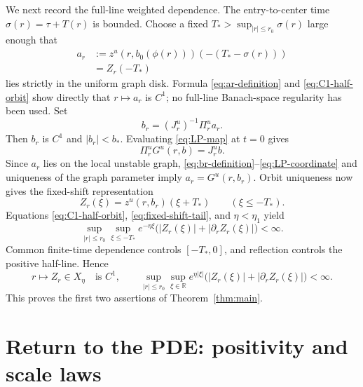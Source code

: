\documentclass[11pt,reqno]{amsart}
\numberwithin{equation}{section}
\theoremstyle{remark}
\newcommand{\R}{\mathbb R}
\begin{document}
We next record the full-line weighted dependence.  The entry-to-center time
$\sigma(r)=\tau+T(r)$ is bounded.  Choose a fixed
$T_*>\sup_{|r|\le r_0}\sigma(r)$ large enough that
\begin{equation}\label{eq:ar-definition}
 \begin{aligned}
 a_r&:=z^u\!\left(r,b_0(\phi(r))\right)
       \left(-(T_*-\sigma(r))\right)\\
    &=Z_r(-T_*)
 \end{aligned}
\end{equation}
lies strictly in the uniform graph disk.  Formula
\eqref{eq:ar-definition} and \eqref{eq:C1-half-orbit} show directly that
$r\mapsto a_r$ is $C^1$; no full-line Banach-space regularity has been used.
Set
\begin{equation}\label{eq:br-definition}
 b_r=(J_r^u)^{-1}\Pi_r^u a_r.
\end{equation}
Then $b_r$ is $C^1$ and $|b_r|<b_*$.  Evaluating
\eqref{eq:LP-map} at $t=0$ gives
\begin{equation}\label{eq:LP-coordinate}
 \Pi_r^uG^u(r,b)=J_r^ub.
\end{equation}
Since $a_r$ lies on the local unstable graph,
\eqref{eq:br-definition}--\eqref{eq:LP-coordinate} and uniqueness of the
graph parameter imply $a_r=G^u(r,b_r)$.  Orbit uniqueness now gives the
fixed-shift representation
\begin{equation}\label{eq:fixed-shift-tail}
 Z_r(\xi)=z^u(r,b_r)(\xi+T_*)
 \qquad(\xi\le-T_*).
\end{equation}
Equations \eqref{eq:C1-half-orbit}, \eqref{eq:fixed-shift-tail}, and
$\eta<\eta_1$ yield
\begin{equation}\label{eq:negative-tail-C1}
 \sup_{|r|\le r_0}\sup_{\xi\le-T_*}e^{-\eta\xi}
 \bigl(|Z_r(\xi)|+|\partial_rZ_r(\xi)|\bigr)<\infty.
\end{equation}
Common finite-time dependence controls $[-T_*,0]$, and reflection controls
the positive half-line.  Hence
\begin{equation}\label{eq:full-C1}
 r\longmapsto Z_r\in X_\eta\quad\text{is }C^1,
 \qquad
 \sup_{|r|\le r_0}\sup_{\xi\in\R}e^{\eta|\xi|}
 \bigl(|Z_r(\xi)|+|\partial_rZ_r(\xi)|\bigr)<\infty.
\end{equation}
This proves the first two assertions of Theorem~\ref{thm:main}.

\section{Return to the PDE: positivity and scale laws}\label{sec:pde-conclusions}
\end{document}
